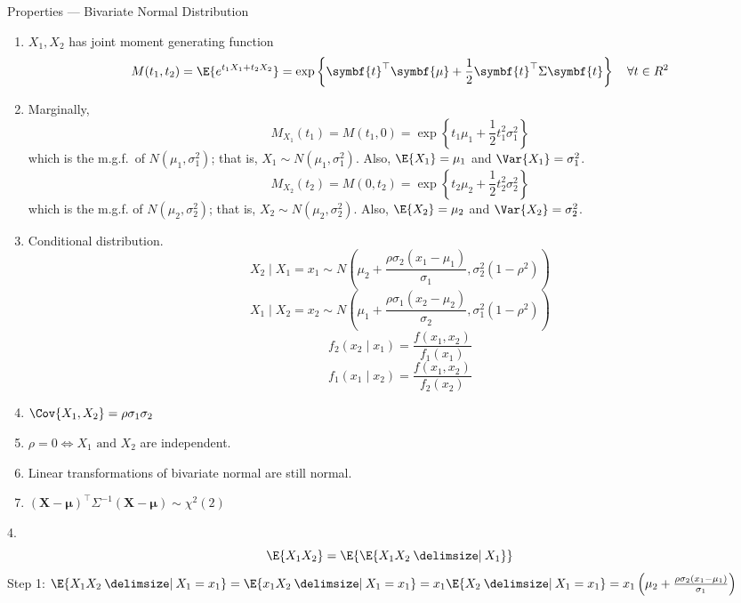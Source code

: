 \begin{Proposition}{Properties --- Bivariate Normal Distribution}{}
    \begin{enumerate}[label=(\arabic*)]
        \item $ X_1,X_2 $ has joint moment generating function
              \[ M(t_1,t_2)=\E{
                      e^{t_1X_1+t_2X_2}
                  }=\exp\left\{ \symbf{t}^\top \symbf{\mu}+\frac{1}{2}\symbf{t}^\top \Sigma
                  \symbf{t} \right\}\quad \forall t\in\mathbb{R}^2 \]
        \item Marginally,
              \[ M_{X_1}(t_1)=M(t_1,0)=\exp\left\{ t_1\mu_1+\frac{1}{2} t_1^2
                  \sigma_1^2\right\} \]
              which is the m.g.f.\ of $ N(\mu_1,\sigma_1^2) $; that is,
              $ X_1 \sim N(\mu_1,\sigma_1^2) $. Also,
              $ \E{X_1}=\mu_1 $ and $ \Var{X_1}=\sigma_1^2 $.
              \[ M_{X_2}(t_2)=M(0,t_2)=\exp\left\{ t_2\mu_2+\frac{1}{2} t_2^2
                  \sigma_2^2\right\} \]
              which is the m.g.f. of $ N(\mu_2,\sigma_2^2) $; that is,
              $ X_2 \sim N(\mu_2,\sigma_2^2) $. Also,
              $ \E{X_2}=\mu_2 $ and $ \Var{X_2}=\sigma_2^2 $.
        \item Conditional distribution.
              \[ X_2\mid X_1=x_1 \sim N
                  \left( \mu_2+\frac{\rho\sigma_2(x_1-\mu_1)}{\sigma_1} ,
                  \sigma_2^2(1-\rho^2) \right) \]
              \[ X_1\mid X_2=x_2 \sim N
                  \left( \mu_1+\frac{\rho\sigma_1(x_2-\mu_2)}{\sigma_2} ,
                  \sigma_1^2(1-\rho^2) \right) \]
              \[ f_2(x_2\mid x_1)=\frac{f(x_1,x_2)}{f_1(x_1)}  \]
              \[ f_1(x_1\mid x_2)=\frac{f(x_1,x_2)}{f_2(x_2)}  \]
        \item $ \Cov{X_1,X_2}=\rho\sigma_1\sigma_2 $
        \item $ \rho=0\iff X_1\text{ and }X_2 $ are independent.
        \item Linear transformations of bivariate
              normal are still normal.
        \item $ (\symbf{X}-\symbf{\mu})^\top \Sigma^{-1}(\symbf{X}-\symbf{\mu})\sim \chi^2(2) $
    \end{enumerate}
\end{Proposition}

4. \[ \E{X_1X_2}=\E{\E{X_1X_2\given X_1}} \]
Step 1: $ \E{X_1X_2\given X_1=x_1}=\E{x_1X_2\given X_1=x_1}=
    x_1\E{X_2\given X_1=x_1}=x_1
    \left(  \mu_2+\frac{\rho\sigma_2(x_1-\mu_1)}{\sigma_1} \right) $

